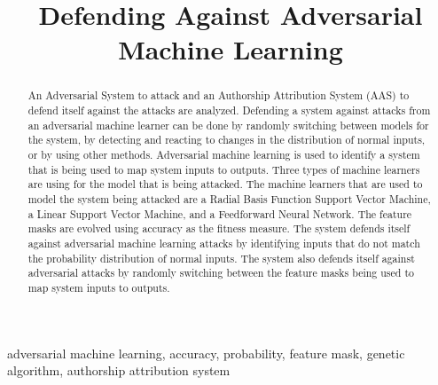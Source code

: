 \documentclass[conference]{IEEEtran}
\begin{document}
\title{Defending Against Adversarial Machine Learning}

\author{}

\maketitle

\begin{abstract}
An Adversarial System to attack and an Authorship Attribution System (AAS) to defend itself against the attacks are analyzed. 
Defending a system against attacks from an adversarial machine learner can be done by randomly switching between models for the system, by detecting and reacting to changes in the distribution of normal inputs, or by using other methods. Adversarial machine learning is used to identify a system that is being used to map system inputs to outputs. 
Three types of machine learners are using for the model that is being attacked. The machine learners that are used to model the system being attacked are a Radial Basis Function Support Vector Machine, a Linear Support Vector Machine, and a Feedforward Neural Network. The feature masks are evolved using accuracy as the fitness measure. The system defends itself against adversarial machine learning attacks by identifying inputs that do not match the probability distribution of normal inputs. The system also defends itself against adversarial attacks by randomly switching between the feature masks being used to map system inputs to outputs. 

\end{abstract}

\begin{IEEEkeywords}
adversarial machine learning, accuracy, probability, feature mask, genetic algorithm, authorship attribution system%
\end{IEEEkeywords}
\end{document}
